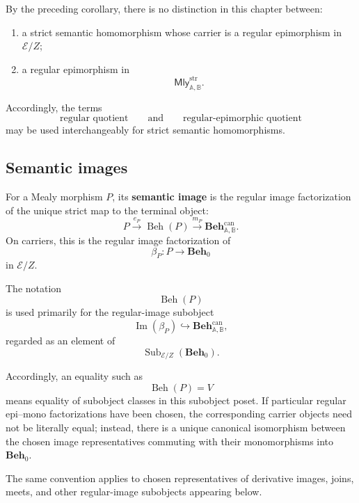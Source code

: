 \begin{remark}
\label{rem:regular-quotient-terminology}
    By the preceding corollary, there is no distinction in this chapter
    between:

    \begin{enumerate}
        \item a strict semantic homomorphism whose carrier is a regular
        epimorphism in \(\mathcal E/Z\);

        \item a regular epimorphism in
        \[
            \mathsf{Mly}^{\mathrm{str}}_{\mathbb A,\mathbb B}.
        \]
    \end{enumerate}

    Accordingly, the terms
    \[
        \text{regular quotient}
        \qquad\text{and}\qquad
        \text{regular-epimorphic quotient}
    \]
    may be used interchangeably for strict semantic homomorphisms.
\end{remark}

\subsection{Semantic images}
\label{subsec:semantic-images}

\begin{definition}
\label{def:semantic-image}
    For a Mealy morphism \(P\), its \textbf{semantic image} is the regular
    image factorization of the unique strict map to the terminal object:
    \[
        P\xrightarrow{e_P}\operatorname{Beh}(P)
        \xrightarrow{m_P}
        \mathbf{Beh}^{\mathrm{can}}_{\mathbb A,\mathbb B}.
    \]
    On carriers, this is the regular image factorization of
    \[
        \beta_P:P\to\mathbf{Beh}_0
    \]
    in \(\mathcal E/Z\).
\end{definition}

\begin{remark}
\label{rem:semantic-image-subobject-convention}
    The notation
    \[
        \operatorname{Beh}(P)
    \]
    is used primarily for the regular-image subobject
    \[
        \operatorname{Im}(\beta_P)
        \hookrightarrow
        \mathbf{Beh}^{\mathrm{can}}_{\mathbb A,\mathbb B},
    \]
    regarded as an element of
    \[
        \operatorname{Sub}_{\mathcal E/Z}(\mathbf{Beh}_0).
    \]

    Accordingly, an equality such as
    \[
        \operatorname{Beh}(P)=V
    \]
    means equality of subobject classes in this subobject poset. If particular
    regular epi--mono factorizations have been chosen, the corresponding
    carrier objects need not be literally equal; instead, there is a unique
    canonical isomorphism between the chosen image representatives commuting
    with their monomorphisms into \(\mathbf{Beh}_0\).

    The same convention applies to chosen representatives of derivative
    images, joins, meets, and other regular-image subobjects appearing below.
\end{remark}

